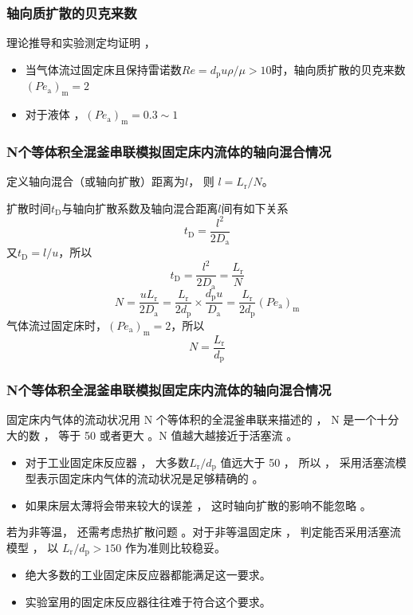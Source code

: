 \begin{frame}
    \frametitle{轴向质扩散的贝克来数}
    理论推导和实验测定均证明 ， 
    \begin{itemize}
      \item 当气体流过固定床且保持雷诺数$Re = d_\mathrm{p}u\rho/\mu>10$时，轴向质扩散的贝克来数$(P e_\mathrm{a})_\mathrm{m}=2$
      \item 对于液体 ，$(P e_\mathrm{a})_\mathrm{m}=0.3\sim 1$
    \end{itemize}

\end{frame}


\begin{frame}
    \frametitle{N个等体积全混釜串联模拟固定床内流体的轴向混合情况}
    定义轴向混合（或轴向扩散）距离为$l$， 则 $l=L_\mathrm{r}/N$。
    
    扩散时间$t_\mathrm{D}$与轴向扩散系数及轴向混合距离$l$间有如下关系
    \[
        t_\mathrm{D} = \frac{l^2}{2D_\mathrm{a}}
    \]
    又$t_\mathrm{D} = l/u$，所以
    \[
        t_\mathrm{D} = \frac{l^2}{2D_\mathrm{a}} = \frac{L_\mathrm{r}}{N}
    \]
    \[
        N = \frac{uL_\mathrm{r}}{2D_\mathrm{a}} = \frac{L_\mathrm{r}}{2d_\mathrm{p}}\times \frac{d_\mathrm{p}u}{D_\mathrm{a}} = \frac{L_\mathrm{r}}{2d_\mathrm{p}}(P e_\mathrm{a})_\mathrm{m}
    \]
    气体流过固定床时，$(P e_\mathrm{a})_\mathrm{m}=2$，所以
    \[
        N = \frac{L_\mathrm{r}}{d_\mathrm{p}}
    \]
\end{frame}


\begin{frame}
    \frametitle{N个等体积全混釜串联模拟固定床内流体的轴向混合情况}
    固定床内气体的流动状况用 N 个等体积的全混釜串联来描述的 ， N 是一个十分大的数 ， 等于 50 或者更大 。N 值越大越接近于活塞流 。
    \begin{itemize}
      \item 对于工业固定床反应器 ， 大多数$L_\mathrm{r}/d_\mathrm{p}$ 值远大于 50 ， 所以 ， 采用活塞流模型表示固定床内气体的流动状况是足够精确的 。
      \item 如果床层太薄将会带来较大的误差 ， 这时轴向扩散的影响不能忽略 。
    \end{itemize}
    若为非等温， 还需考虑热扩散问题 。对于非等温固定床 ， 判定能否采用活塞流模型 ， 以 ${L_\mathrm{r}}/{d_\mathrm{p}}> 150$ 作为准则比较稳妥。
    \begin{itemize}
      \item 绝大多数的工业固定床反应器都能满足这一要求。
      \item 实验室用的固定床反应器往往难于符合这个要求。
    \end{itemize}
\end{frame}


